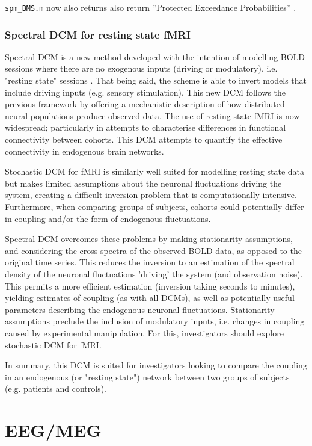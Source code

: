 \documentclass[a4paper,titlepage,openany]{article}
\begin{document}
\begin{multicols}{2}
\texttt{spm\_BMS.m} now also returns also return ''Protected Exceedance Probabilities'' \cite{Rigoux2014}.

\subsubsection{Spectral DCM for resting state fMRI}

Spectral DCM is a new method developed with the intention of modelling BOLD sessions where there are no exogenous inputs (driving or modulatory), i.e. "resting state" sessions \cite{rsDCM2014}. That being said, the scheme is able to invert models that include driving inputs (e.g. sensory stimulation). This new DCM follows the previous framework by offering a mechanistic description of how distributed neural populations produce observed data. The use of resting state fMRI is now widespread; particularly in attempts to characterise differences in functional connectivity between cohorts. This DCM attempts to quantify the effective connectivity in endogenous brain networks.

Stochastic DCM for fMRI is similarly well suited for modelling resting state data but makes limited assumptions about the neuronal fluctuations driving the system, creating a difficult inversion problem that is computationally intensive. Furthermore, when comparing groups of subjects, cohorts could potentially differ in coupling and/or the form of endogenous fluctuations.

Spectral DCM overcomes these problems by making stationarity assumptions, and considering the cross-spectra of the observed BOLD data, as opposed to the original time series. This reduces the inversion to an estimation of the spectral density of the neuronal fluctuations 'driving' the system (and observation noise). This permits a more efficient estimation (inversion taking seconds to minutes), yielding estimates of coupling (as with all DCMs), as well as potentially useful parameters describing the endogenous neuronal fluctuations. Stationarity assumptions preclude the inclusion of modulatory inputs, i.e. changes in coupling caused by experimental manipulation. For this, investigators should explore stochastic DCM for fMRI.

In summary, this DCM is suited for investigators looking to compare the coupling in an endogenous (or "resting state") network between two groups of subjects (e.g. patients and controls).

\section{EEG/MEG}


\end{multicols}
\end{document}
